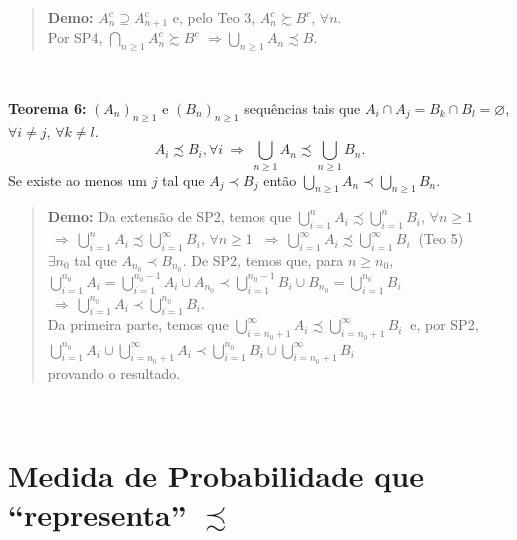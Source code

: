 \documentclass[
]{book}
\begin{document}
\begin{quote}
\textbf{Demo:} \(A_n^c \supseteq A_{n+1}^c\) e, pelo Teo 3, \(A_n^c \succsim B^c\), \(\forall n\).\\
Por SP4, \(\bigcap_{n \geq 1} A_n^c \succsim B^c\) \(\Rightarrow \bigcup_{n \geq 1} A_n \precsim B.\)
\end{quote}

\(~\)

\textbf{Teorema 6:} \(\left(A_n\right)_{n \geq 1}\) e \(\left(B_n\right)_{n \geq 1}\) sequências tais que \(A_i \cap A_j = B_k \cap B_l = \varnothing\), \(\forall i \neq j\), \(\forall k \neq l\).
\[A_i \precsim B_i, \forall i ~\Rightarrow~ \bigcup_{n \geq 1} A_n \precsim \bigcup_{n \geq 1} B_n.\]
Se existe ao menos um \(j\) tal que \(A_j \prec B_j\) então \(\displaystyle{ \bigcup_{n \geq 1} A_n \prec \bigcup_{n \geq 1} B_n }.\)

\begin{quote}
\textbf{Demo:} Da extensão de SP2, temos que \(\displaystyle{ \bigcup_{i = 1}^n A_i \precsim \bigcup_{i = 1}^n B_i }\), \(\forall n \geq 1\) \(~\Rightarrow~ \displaystyle{ \bigcup_{i = 1}^n A_i \precsim \bigcup_{i = 1}^{\infty} B_i }\), \(\forall n \geq 1\) \(~\Rightarrow~ \displaystyle{ \bigcup_{i = 1}^{\infty} A_i \precsim \bigcup_{i = 1}^{\infty} B_i }~\) (Teo 5)\\
\(\exists n_0\) tal que \(A_{n_0} \prec B_{n_0}\). De SP2, temos que, para \(n \geq n_0\),\\
\(\displaystyle \bigcup_{i = 1}^{n_0} A_i = \bigcup_{i = 1}^{n_0-1} A_i \cup A_{n_0} \prec \bigcup_{i = 1}^{n_0-1} B_i \cup B_{n_0} = \bigcup_{i = 1}^{n_0} B_i\) \(~\Rightarrow~ \displaystyle \bigcup_{i = 1}^{n_0} A_i \prec \bigcup_{i = 1}^{n_0} B_i.\)\\
Da primeira parte, temos que \(\displaystyle{ \bigcup_{i = n_0+1}^{\infty} A_i \precsim \bigcup_{i = n_0+1}^{\infty} B_i } ~\) e, por SP2,\\
\(\displaystyle \bigcup_{i = 1}^{n_0} A_i \cup \bigcup_{i = n_0+1}^{\infty} A_i \prec \bigcup_{i = 1}^{n_0} B_i \cup \bigcup_{i = n_0+1}^{\infty} B_i\)\\
provando o resultado.
\end{quote}

\(~\)

\hypertarget{medida-de-probabilidade-que-representa-precsim}{%
\section{\texorpdfstring{Medida de Probabilidade que ``representa'' \(\precsim\)}{Medida de Probabilidade que ``representa'' \textbackslash precsim}}\label{medida-de-probabilidade-que-representa-precsim}}
\end{document}
